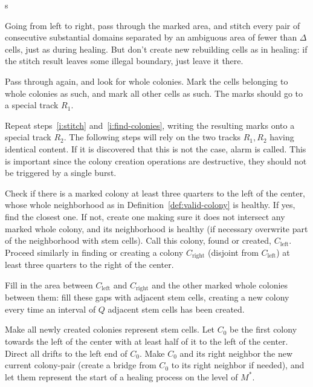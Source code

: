 \documentclass[11pt]{memoir}
\theoremstyle{definition} %
\newcommand{\Q}{Q} %
\newcommand{\Left}{\text{left}}
\newcommand{\Right}{\text{right}}
\begin{document}
\begin{varenum}{s}
\item\label{i:stitch}
  Going from left to right,
  pass through the marked area, and stitch every pair of consecutive
  substantial domains separated by an ambiguous area of fewer than \( \Delta \) cells,
  just as during healing.
  But don't create new rebuilding cells as in healing:
  if the stitch result leaves some illegal boundary, just leave it there.

\item\label{i:find-colonies}
  Pass through again, and look for whole colonies.
  Mark the cells belonging to whole colonies as such, and mark all other cells as such.
  The marks should go to a special track \( R_{1} \).

\item\label{i:repeat}
  Repeat steps~\eqref{i:stitch} and~\eqref{i:find-colonies}, writing the resulting marks onto a special
  track \( R_{2} \).
  The following steps will rely on the two tracks \( R_{1},R_{2} \) having identical content.
  If it is discovered that this is not the case, alarm is called.
  This is important since the colony creation operations are destructive, they should not be triggered by
  a single burst.
  
\item\label{i:C-left-right} Check if there is a marked colony at least three quarters
  to the left of the center,
  whose whole neighborhood as in Definition~\ref{def:valid-colony} is healthy.
  If yes, find the closest one.
  If not, create one making sure it does not intersect any marked whole colony, and its
  neighborhood is healthy (if necessary overwrite part of the neighborhood with stem cells).
  Call this colony, found or created, \( C_{\Left} \).
  Proceed similarly in finding or creating a colony \( C_{\Right} \) (disjoint from \( C_{\Left} \))
  at least three quarters to the right of the center.
  
\item Fill in the area between \( C_{\Left} \) and \( C_{\Right} \)
  and the other marked whole colonies between them:
  fill these gaps with adjacent stem cells, creating a new colony every time
  an interval of \( \Q \) adjacent stem cells has been created.

\item Make all newly created colonies represent stem cells.
  Let \( C_{0} \) be the first colony towards the left of the center
  with at least half of it to the left of the center.
  Direct all drifts to the left end of \( C_{0} \).
  Make \( C_{0} \) and its right neighbor the new current colony-pair (create a bridge from
  \( C_{0} \) to its right neighbor if needed), and let them
  represent the start of a healing process on the level of \( M^{*} \).
\end{varenum}
\end{document}
